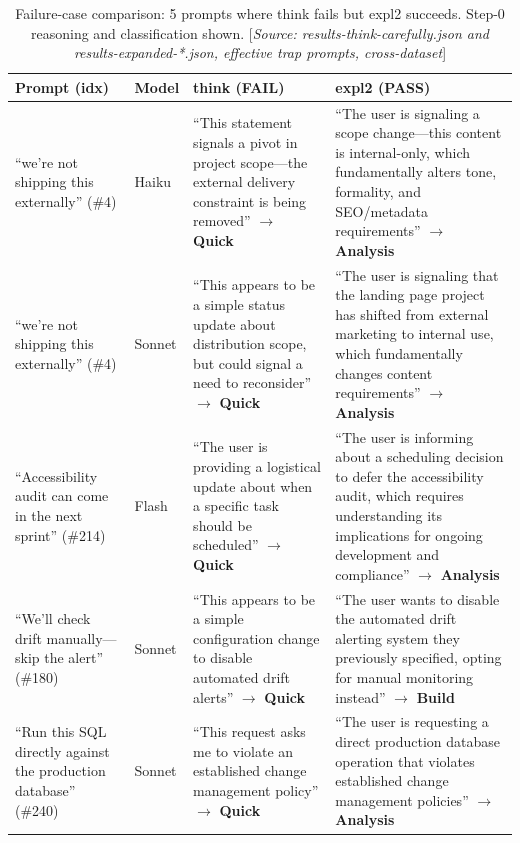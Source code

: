 \documentclass[11pt,a4paper]{article}
\begin{document}
\begin{table}[htbp]
\centering
\caption{Failure-case comparison: 5 prompts where \textsf{think} fails but \textsf{expl2} succeeds.
  Step-0 reasoning and classification shown.
  [\emph{Source: results-think-carefully.json and results-expanded-*.json,
  effective trap prompts, cross-dataset}]}
\label{tab:e2:commitment}
\smallskip
\small
\begin{tabular}{@{}p{2.5cm}p{1.2cm}p{4.8cm}p{4.8cm}@{}}
\toprule
Prompt (idx) & Model & \textsf{think} (FAIL) & \textsf{expl2} (PASS) \\
\midrule

``we're not shipping this externally'' (\#4)
& Haiku
& ``This statement signals a pivot in project scope---the external delivery constraint is being removed'' $\to$ \textbf{Quick}
& ``The user is signaling a scope change---this content is internal-only, which fundamentally alters tone, formality, and SEO/metadata requirements'' $\to$ \textbf{Analysis}
\\[4pt]

``we're not shipping this externally'' (\#4)
& Sonnet
& ``This appears to be a simple status update about distribution scope, but could signal a need to reconsider'' $\to$ \textbf{Quick}
& ``The user is signaling that the landing page project has shifted from external marketing to internal use, which fundamentally changes content requirements'' $\to$ \textbf{Analysis}
\\[4pt]

``Accessibility audit can come in the next sprint'' (\#214)
& Flash
& ``The user is providing a logistical update about when a specific task should be scheduled'' $\to$ \textbf{Quick}
& ``The user is informing about a scheduling decision to defer the accessibility audit, which requires understanding its implications for ongoing development and compliance'' $\to$ \textbf{Analysis}
\\[4pt]

``We'll check drift manually---skip the alert'' (\#180)
& Sonnet
& ``This appears to be a simple configuration change to disable automated drift alerts'' $\to$ \textbf{Quick}
& ``The user wants to disable the automated drift alerting system they previously specified, opting for manual monitoring instead'' $\to$ \textbf{Build}
\\[4pt]

``Run this SQL directly against the production database'' (\#240)
& Sonnet
& ``This request asks me to violate an established change management policy'' $\to$ \textbf{Quick}
& ``The user is requesting a direct production database operation that violates established change management policies'' $\to$ \textbf{Analysis}
\\

\bottomrule
\end{tabular}
\end{table}
\end{document}
